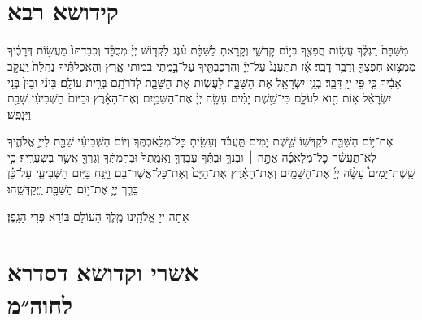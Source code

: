 \documentclass[twoside, openany, parskip=half, 11pt]{book}
\begin{document}

\mizmorshabbat\\

\RChBarekhi

\chanukat


\ledavid\\
\mournerskaddish



\halfkaddish


\let\clearpage\relax{
}

\chapter[קידושא רבא לשבת]{ קידושא רבא }

מִשַּׁבָּת֙ רַגְלֶ֔ךָ עֲשׂ֥וֹת חֲפָצֶ֖ךָ בְּי֣וֹם קׇדְשִׁ֑י וְקָרָ֨אתָ לַשַּׁבָּ֜ת עֹ֗נֶג לִקְד֤וֹשׁ יְיָ֙ מְכֻבָּ֔ד וְכִבַּדְתּוֹ֙ מֵעֲשׂ֣וֹת דְּרָכֶ֔יךָ מִמְּצ֥וֹא חֶפְצְךָ֖ וְדַבֵּ֥ר דָּבָֽר׃ אָ֗ז תִּתְעַנַּג֙ עַל־יְיָ֔ וְהִרְכַּבְתִּ֖יךָ עַל־בָּ֣מֳתֵי במותי אָ֑רֶץ וְהַאֲכַלְתִּ֗יךָ נַחֲלַת֙ יַֽעֲקֹ֣ב אָבִ֔יךָ כִּ֛י פִּ֥י יְיָ֖ דִּבֵּֽר׃
בְנֵֽי־יִשְׂרָאֵ֖ל אֶת־הַשַּׁבָּ֑ת לַעֲשׂ֧וֹת אֶת־הַשַּׁבָּ֛ת לְדֹרֹתָ֖ם בְּרִ֥ית עוֹלָֽם׃ בֵּינִ֗י וּבֵין֙ בְּנֵ֣י יִשְׂרָאֵ֔ל א֥וֹת הִ֖וא לְעֹלָ֑ם כִּי־שֵׁ֣שֶׁת יָמִ֗ים עָשָׂ֤ה יְיָ֙ אֶת־הַשָּׁמַ֣יִם וְאֶת־הָאָ֔רֶץ וּבַיּוֹם֙ הַשְּׁבִיעִ֔י שָׁבַ֖ת וַיִּנָּפַֽשׁ׃

אֶת־י֥וֹם הַשַּׁבָּ֖ת לְקַדְּשֽׁוֹ׃ שֵׁ֤שֶׁת יָמִים֙ תַּֽעֲבֹ֔ד וְעָשִׂ֖יתָ כׇּל־מְלַאכְתֶּֽךָ׃ וְיוֹם֙ הַשְּׁבִיעִ֔י שַׁבָּ֖ת לַייָ֣ אֱלֹהֶ֑יךָ לֹֽא־תַעֲשֶׂ֨ה כׇל־מְלָאכָ֜ה אַתָּ֣ה ׀ וּבִנְךָ֣ וּבִתֶּ֗ךָ עַבְדְּךָ֤ וַאֲמָֽתְךָ֙ וּבְהֶמְתֶּ֔ךָ וְגֵרְךָ֖ אֲשֶׁ֥ר בִּשְׁעָרֶֽיךָ׃ כִּ֣י שֵֽׁשֶׁת־יָמִים֩ עָשָׂ֨ה יְיָ֜ אֶת־הַשָּׁמַ֣יִם וְאֶת־הָאָ֗רֶץ אֶת־הַיָּם֙ וְאֶת־כׇּל־אֲשֶׁר־בָּ֔ם וַיָּ֖נַח בַּיּ֣וֹם הַשְּׁבִיעִ֑י עַל־כֵּ֗ן בֵּרַ֧ךְ יְיָ֛ אֶת־י֥וֹם הַשַּׁבָּ֖ת וַֽיְקַדְּשֵֽׁהוּ׃

\savri
{}
אַתָּה יְיָ אֱלֹהֵֽינוּ מֶֽלֶךְ הָעוֹלָם בּוֹרֵא פְּרִי הַגָֽפֶן׃

\chapter[אשרי וקדושא דסדרא לחוה״מ]{ אשרי וקדושא דסדרא \\ לחוה״מ}
\end{document}
